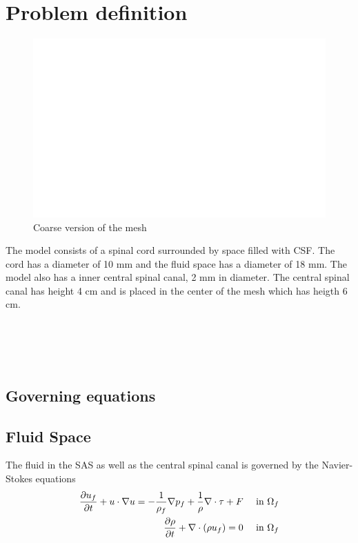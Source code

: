 \section{Problem definition}
\begin{figure}
	\vspace{-60pt}
	\begin{center}
		\includegraphics[scale=0.2]{mesh}
	\end{center}
	\vspace{-20pt}
	\caption{Coarse version of the mesh}
	\vspace{-10pt}
\end{figure}
The model consists of a spinal cord surrounded by space filled with CSF. The cord has a diameter of 10 mm and the fluid space has a diameter of 18 mm. The model also has a inner central spinal canal, 2 mm in diameter. The central spinal canal has height 4 cm and is placed in the center of the mesh which has heigth 6 cm.
\\
\\
\\
\\
\\
\subsection{Governing equations}
\subsection*{Fluid Space}
The fluid in the SAS as well as the central spinal canal is governed by the Navier-Stokes equations
\begin{align}
	\frac{\partial u_f}{\partial t} + u\cdot \nabla u = -\frac{1}{\rho_f}\nabla p_f + \frac{1}{\rho} \nabla \cdot 		\tau + F&& \text{ in } \Omega_f 
	\\
	\frac{\partial \rho}{\partial t} +\nabla \cdot(\rho u_f) = 0 && \text{ in } \Omega_f
\end{align}

